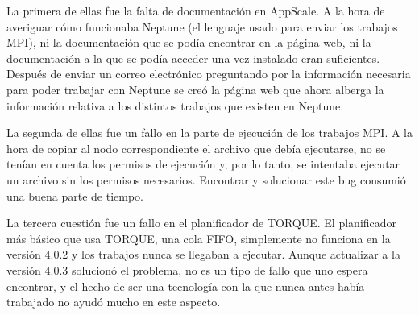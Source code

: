 La primera de ellas fue la falta de documentación en AppScale. A la hora de averiguar cómo funcionaba Neptune (el lenguaje usado para enviar los trabajos MPI), ni la documentación que se podía encontrar en la página web, ni la documentación a la que se podía acceder una vez instalado eran suficientes. Después de enviar un correo electrónico preguntando por la información necesaria para poder trabajar con Neptune se creó la página web que ahora alberga la información relativa a los distintos trabajos que existen en Neptune.

La segunda de ellas fue un fallo en la parte de ejecución de los trabajos MPI. A la hora de copiar al nodo correspondiente el archivo que debía ejecutarse, no se tenían en cuenta los permisos de ejecución y, por lo tanto, se intentaba ejecutar un archivo sin los permisos necesarios. Encontrar y solucionar este bug consumió una buena parte de tiempo.

La tercera cuestión fue un fallo en el planificador de TORQUE. El planificador más básico que usa TORQUE, una cola FIFO, simplemente no funciona en la versión 4.0.2 y los trabajos nunca se llegaban a ejecutar. Aunque actualizar a la versión 4.0.3 solucionó el problema, no es un tipo de fallo que uno espera encontrar, y el hecho de ser una tecnología con la que nunca antes había trabajado no ayudó mucho en este aspecto.
